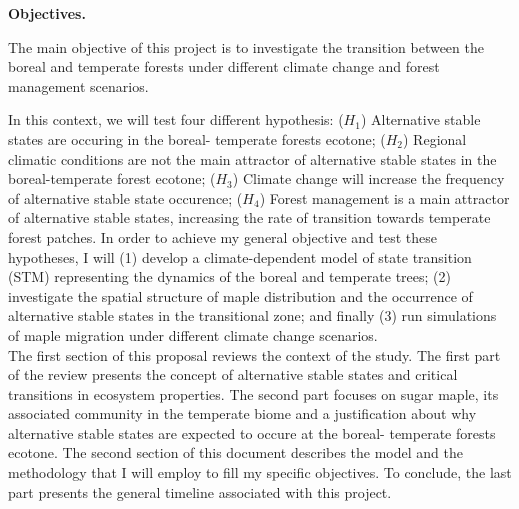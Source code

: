 

\textbf{Objectives.}

The main objective of this project is to investigate the transition 
between the boreal and temperate forests under different climate change and
forest management scenarios.

 
In this context, we will test four different
hypothesis: ($H_1$) Alternative stable states are occuring in the boreal-
temperate forests ecotone; ($H_2$) Regional climatic conditions are not the
main attractor of alternative stable states in the boreal-temperate forest
ecotone; ($H_3$) Climate change will increase the frequency of alternative
stable state occurence; ($H_4$) Forest management is a main attractor of
alternative stable states, increasing the rate of transition towards temperate
forest patches. In order to achieve my general objective and test these hypotheses, I will (1) develop a climate-dependent model of state transition
(STM) representing the dynamics of the boreal and temperate trees; (2)
investigate the spatial structure of maple distribution and the occurrence of
alternative stable states in the transitional zone; and finally (3) run
simulations of maple migration under different climate change
scenarios. \\

The first section of this proposal reviews the context of the study. The first
part of the review presents the concept of alternative stable states and
critical transitions in ecosystem properties. The second part focuses on
sugar maple, its associated community in the temperate biome and a
justification about why alternative stable states are expected to occure at the boreal-
temperate forests ecotone. The second section of this document describes the
model and the methodology that I will employ to fill my specific  objectives.
To conclude, the last part presents the general timeline associated with this
project.

